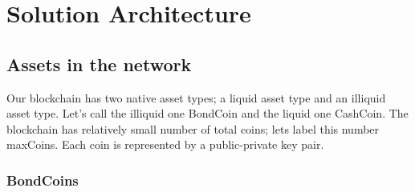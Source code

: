 
\chapter{Solution Architecture} %

\label{Chapter 3} %


\section{Assets in the network}

Our blockchain has two native asset types; a liquid asset type and an illiquid asset type. Let’s call the illiquid one BondCoin and the liquid one CashCoin. The blockchain has relatively small number of total coins; lets label this number maxCoins. Each coin is represented by a public-private key pair.

\subsection{BondCoins}

